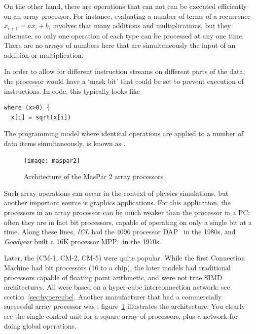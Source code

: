 On the other hand, there are operations that can not can be executed
efficiently on an array processor. For instance, evaluating a number
of terms of a recurrence $x_{i+1}=ax_i+b_i$ involves that many
additions and multiplications, but they alternate, so only one
operation of each type can be processed at any one time. There are no
arrays of numbers here that are simultaneously the input of an
addition or multiplication.

In order to allow for different instruction streams on
different parts of the data, the processor would have a `mask bit'
that could be set to prevent execution of instructions. In code, this 
typically looks like
\begin{verbatim}
where (x>0) {
  x[i] = sqrt(x[i])
\end{verbatim}
The programming model where identical operations are applied to a
number of data items simultaneously, is known as
.

\begin{notlulu}
  \begin{figure}
    \texttt{[image: maspar2]}
    \caption{Architecture of the MasPar 2 array processors}
    \label{fig:maspar}
  \end{figure}
\end{notlulu}
Such array operations can occur in the context of physics simulations,
but another important source is graphics applications. For this
application, the processors in an array processor can be much weaker
than the processor in a PC: often they are in fact bit processors,
capable of operating on only a single bit at a time. Along these
lines, \emph{ICL} had the 4096 processor
DAP~\cite{DAP:79a} in the 1980s, and
\emph{Goodyear} built a 16K processor
MPP~\cite{Batcher:85a} in the 1970s.

Later, the  (CM-1, CM-2, CM-5) were quite popular.
While the first Connection Machine had bit processors (16 to a chip),
the later models had traditional processors capable of floating point
arithmetic, and were not true SIMD architectures. All were based on a
hyper-cube interconnection network; see section~\ref{sec:hypercube}. Another
manufacturer that had a commercially successful array processor was
; figure~\ref{fig:maspar} illustrates the architecture.
You clearly see the single control unit for a square array of processors,
plus a network for doing global operations.

